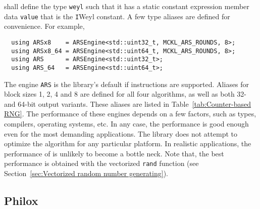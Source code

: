 shall define the type \verb|weyl| such that it has a static constant expression
member data \verb|value| that is the \verb|I|\ith Weyl constant. A few type
aliases are defined for convenience. For example,
\begin{Verbatim}
  using ARSx8    = ARSEngine<std::uint32_t, MCKL_ARS_ROUNDS, 8>;
  using ARSx8_64 = ARSEngine<std::uint64_t, MCKL_ARS_ROUNDS, 8>;
  using ARS      = ARSEngine<std::uint32_t>;
  using ARS_64   = ARSEngine<std::uint64_t>;
\end{Verbatim}
The engine \verb|ARS| is the library's default \rng if \aesni instructions are
supported. Aliases for block sizes 1, 2, 4 and 8 are defined for all four
algorithms, as well as both 32- and 64-bit output variants. These aliases are
listed in Table~\ref{tab:Counter-based RNG}. The performance of these engines
depends on a few factors, such as \cpu types, compilers, operating systems,
etc. In any case, the performance is good enough even for the most demanding
applications. The library does not attempt to optimize the algorithm for any
particular platform. In realistic applications, the performance of \rng is
unlikely to become a bottle neck. Note that, the best performance is obtained
with the vectorized \verb|rand| function (see Section~\ref{sec:Vectorized
random number generating}).

\subsection{Philox}
\label{sub:Philox}

